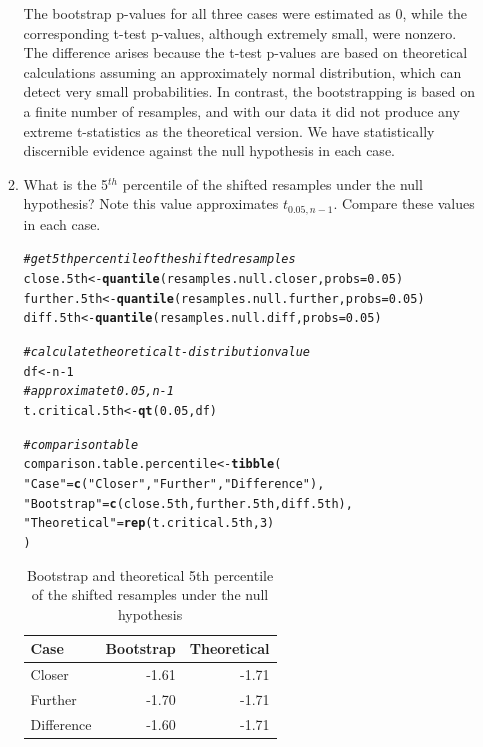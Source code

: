 \documentclass{article}\usepackage[]{graphicx}\usepackage[]{xcolor}
\makeatletter
\newcommand{\hlnum}[1]{\textcolor[rgb]{0.686,0.059,0.569}{#1}}%
\newcommand{\hlsng}[1]{\textcolor[rgb]{0.192,0.494,0.8}{#1}}%
\newcommand{\hlcom}[1]{\textcolor[rgb]{0.678,0.584,0.686}{\textit{#1}}}%
\newcommand{\hlopt}[1]{\textcolor[rgb]{0,0,0}{#1}}%
\newcommand{\hldef}[1]{\textcolor[rgb]{0.345,0.345,0.345}{#1}}%
\newcommand{\hlkwb}[1]{\textcolor[rgb]{0.69,0.353,0.396}{#1}}%
\newcommand{\hlkwc}[1]{\textcolor[rgb]{0.333,0.667,0.333}{#1}}%
\newcommand{\hlkwd}[1]{\textcolor[rgb]{0.737,0.353,0.396}{\textbf{#1}}}%
\newenvironment{kframe}{%
 \def\at@end@of@kframe{}%
 \ifinner\ifhmode%
  \def\at@end@of@kframe{\end{minipage}}%
  \begin{minipage}{\columnwidth}%
 \fi\fi%
 \def\FrameCommand##1{\hskip\@totalleftmargin \hskip-\fboxsep
 \colorbox{shadecolor}{##1}\hskip-\fboxsep
     \hskip-\linewidth \hskip-\@totalleftmargin \hskip\columnwidth}%
 \MakeFramed {\advance\hsize-\width
   \@totalleftmargin\z@ \linewidth\hsize
   \@setminipage}}%
 {\par\unskip\endMakeFramed%
 \at@end@of@kframe}
\newenvironment{knitrout}{}{} %
\makeatother
\begin{document}
\begin{enumerate}
\begin{enumerate}
The bootstrap p-values for all three cases were estimated as 0, while the corresponding t-test p-values, although extremely small, were nonzero. The difference arises because the t-test p-values are based on theoretical calculations assuming an approximately normal distribution, which can detect very small probabilities. In contrast, the bootstrapping is based on a finite number of resamples, and with our data it did not produce any extreme t-statistics as the theoretical version. We have statistically discernible evidence against the null hypothesis in each case.

    \item What is the 5$^{th}$ percentile of the shifted resamples under the null hypothesis? 
  Note this value approximates $t_{0.05, n-1}$. Compare these values in each case.
\begin{knitrout}\scriptsize
{}\color{fgcolor}\begin{kframe}
\begin{alltt}
\hlcom{#get 5th percentile of the shifted resamples}
\hldef{close.5th} \hlkwb{<-} \hlkwd{quantile}\hldef{(resamples.null.closer,} \hlkwc{probs} \hldef{=} \hlnum{0.05}\hldef{)}
\hldef{further.5th} \hlkwb{<-} \hlkwd{quantile}\hldef{(resamples.null.further,} \hlkwc{probs} \hldef{=} \hlnum{0.05}\hldef{)}
\hldef{diff.5th} \hlkwb{<-} \hlkwd{quantile}\hldef{(resamples.null.diff,} \hlkwc{probs} \hldef{=} \hlnum{0.05}\hldef{)}

\hlcom{#calculate theoretical t-distribution value}
\hldef{df} \hlkwb{<-} \hldef{n}\hlopt{-}\hlnum{1}
\hlcom{#approximate t0.05,n-1}
\hldef{t.critical.5th} \hlkwb{<-} \hlkwd{qt}\hldef{(}\hlnum{0.05}\hldef{, df)}

\hlcom{#comparison table}
\hldef{comparison.table.percentile} \hlkwb{<-}\hlkwd{tibble}\hldef{(}
\hlsng{"Case"} \hldef{=} \hlkwd{c}\hldef{(}\hlsng{"Closer"}\hldef{,} \hlsng{"Further"}\hldef{,} \hlsng{"Difference"}\hldef{),}
\hlsng{"Bootstrap"} \hldef{=} \hlkwd{c}\hldef{(close.5th, further.5th, diff.5th),}
\hlsng{"Theoretical"} \hldef{=} \hlkwd{rep}\hldef{(t.critical.5th,} \hlnum{3}\hldef{)}
\hldef{)}
\end{alltt}
\end{kframe}
\end{knitrout}
\begin{table}[ht]
\centering
\begin{tabular}{lrr}
  \hline
Case & Bootstrap & Theoretical \\ 
  \hline
Closer & -1.61 & -1.71 \\ 
  Further & -1.70 & -1.71 \\ 
  Difference & -1.60 & -1.71 \\ 
   \hline
\end{tabular}
\caption{Bootstrap and theoretical 5th percentile of the shifted resamples under the null hypothesis} 
\end{table}


\end{enumerate}
\end{enumerate}
\end{document}
